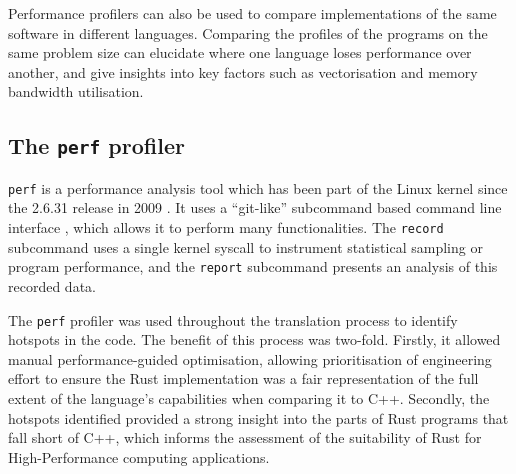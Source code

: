 Performance profilers can also be used to compare implementations of the same software in different languages. Comparing the  profiles of the programs on the same problem size can elucidate where one language loses performance over another, and give insights into key factors such as vectorisation and memory bandwidth utilisation.



\subsection{The \texttt{perf} profiler}
\label{ssec:perf-profiler}

\texttt{perf} is a performance analysis tool which has been part of the Linux kernel since the 2.6.31 release in 2009 \cite{PerfcountersAddedMainline}. It uses a ``git-like'' subcommand based command line interface  \cite{de2010new}, which allows it to perform many functionalities. The \texttt{record} subcommand uses a single kernel syscall to instrument statistical sampling or program performance, and the \texttt{report} subcommand presents an analysis of this recorded data.

The \texttt{perf} profiler was used throughout the translation process to identify hotspots in the code. The benefit of this process was two-fold. Firstly, it allowed manual performance-guided optimisation, allowing prioritisation of engineering effort to ensure the Rust implementation was a fair representation of the full extent of the language's capabilities when comparing it to C++. Secondly, the hotspots identified provided a strong insight into the parts of Rust programs that fall short of C++, which informs the assessment of the suitability of Rust for High-Performance computing applications.

